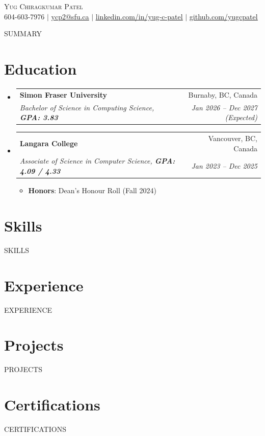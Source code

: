 \documentclass[letterpaper,12pt]{article}
\makeatletter
\newcommand{\resumeItem}[1]{
  \item\small{{#1 \vspace{-2pt}}}
}
\newcommand{\resumeSubheading}[4]{
  \vspace{-2pt}\item
  \begin{tabular*}{0.97\textwidth}[t]{l@{\extracolsep{\fill}}r}
    \textbf{#1} & #2 \\
    \textit{\small#3} & \textit{\small #4} \\
  \end{tabular*}\vspace{-7pt}
}
\newcommand{\resumeSubHeadingListStart}{\begin{itemize}[leftmargin=0.15in, label={}]}
\newcommand{\resumeSubHeadingListEnd}{\end{itemize}}
\newcommand{\resumeItemListStart}{\begin{itemize}}
\newcommand{\resumeItemListEnd}{\end{itemize}\vspace{-5pt}}
\makeatother
\begin{document}
\begin{center}
    {\Huge \scshape \textcolor{primarycolor}{Yug Chiragkumar Patel}} \\ \vspace{1pt}
    \small 604-603-7976 $|$ \href{mailto:ycp2@sfu.ca}{\underline{ycp2@sfu.ca}} $|$ 
    \href{https://linkedin.com/in/yug-c-patel}{\underline{linkedin.com/in/yug-c-patel}} $|$
    \href{https://github.com/yugcpatel}{\underline{github.com/yugcpatel}}
\end{center}

{{SUMMARY}}

\section{Education}
\resumeSubHeadingListStart
  \resumeSubheading
    {Simon Fraser University}{Burnaby, BC, Canada}
    {Bachelor of Science in Computing Science, \textbf{GPA: 3.83}}{Jan 2026 -- Dec 2027 (Expected)}

  \resumeSubheading
    {Langara College}{Vancouver, BC, Canada}
    {Associate of Science in Computer Science, \textbf{GPA: 4.09 / 4.33}}{Jan 2023 -- Dec 2025}
    \resumeItemListStart
      \resumeItem{\textbf{Honors}: Dean's Honour Roll (Fall 2024)}
    \resumeItemListEnd
\resumeSubHeadingListEnd

\section{Skills}
\begin{itemize}[leftmargin=0.15in, label={}]
\small{\item{
{{SKILLS}}
}}
\end{itemize}

\section{Experience}
\resumeSubHeadingListStart
{{EXPERIENCE}}
\resumeSubHeadingListEnd

\section{Projects}
\resumeSubHeadingListStart
{{PROJECTS}}
\resumeSubHeadingListEnd

\section{Certifications}
\resumeSubHeadingListStart
{{CERTIFICATIONS}}
\resumeSubHeadingListEnd
\end{document}
